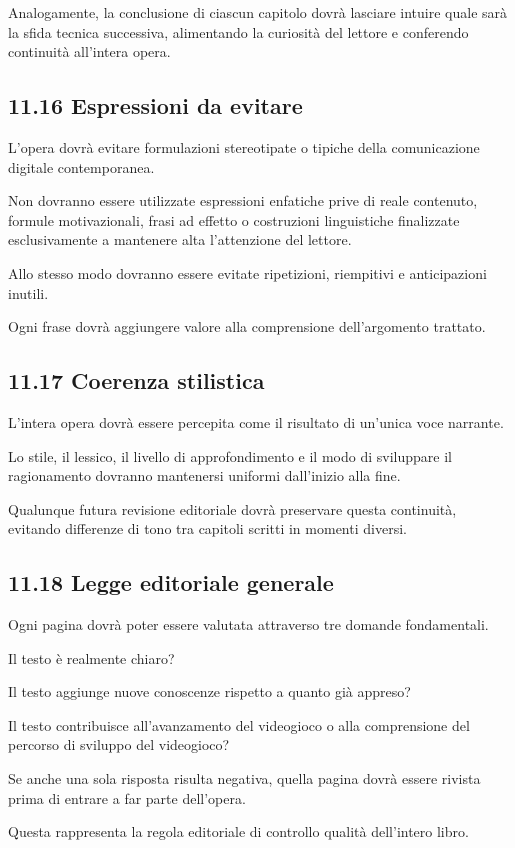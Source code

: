 \documentclass{article}
\begin{document}
Analogamente, la conclusione di ciascun capitolo dovrà lasciare intuire quale sarà la sfida tecnica successiva,
alimentando la curiosità del lettore e conferendo continuità all'intera opera.

\subsection{11.16 Espressioni da evitare}
L'opera dovrà evitare formulazioni stereotipate o tipiche della comunicazione digitale contemporanea.

Non dovranno essere utilizzate espressioni enfatiche prive di reale contenuto, formule motivazionali, frasi ad effetto o
costruzioni linguistiche finalizzate esclusivamente a mantenere alta l'attenzione del lettore.

Allo stesso modo dovranno essere evitate ripetizioni, riempitivi e anticipazioni inutili.

Ogni frase dovrà aggiungere valore alla comprensione dell'argomento trattato.

\subsection{11.17 Coerenza stilistica}
L'intera opera dovrà essere percepita come il risultato di un'unica voce narrante.

Lo stile, il lessico, il livello di approfondimento e il modo di sviluppare il ragionamento dovranno mantenersi uniformi
dall'inizio alla fine.

Qualunque futura revisione editoriale dovrà preservare questa continuità, evitando differenze di tono tra capitoli
scritti in momenti diversi.

\subsection{11.18 Legge editoriale generale}
Ogni pagina dovrà poter essere valutata attraverso tre domande fondamentali.

Il testo è realmente chiaro?

Il testo aggiunge nuove conoscenze rispetto a quanto già appreso?

Il testo contribuisce all'avanzamento del videogioco o alla comprensione del percorso di sviluppo del videogioco?

Se anche una sola risposta risulta negativa, quella pagina dovrà essere rivista prima di entrare a far parte dell'opera.

Questa rappresenta la regola editoriale di controllo qualità dell'intero libro.
\end{document}
